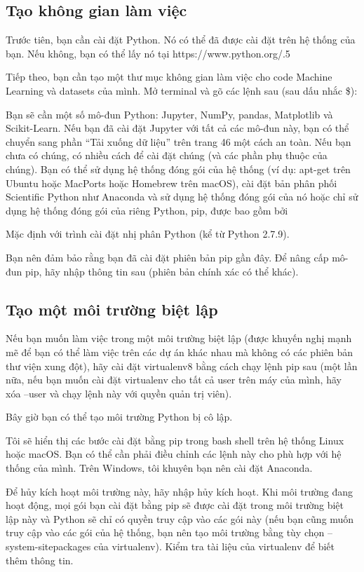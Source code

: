 \subsection{Tạo không gian làm việc}

Trước tiên, bạn cần cài đặt Python. Nó có thể đã được cài đặt trên hệ thống của bạn. Nếu không, bạn có thể lấy nó tại https://www.python.org/.5

Tiếp theo, bạn cần tạo một thư mục không gian làm việc cho code Machine Learning và datasets của mình. Mở terminal và gõ các lệnh sau (sau dấu nhắc \$):

Bạn sẽ cần một số mô-đun Python: Jupyter, NumPy, pandas, Matplotlib và Scikit-Learn. Nếu bạn đã cài đặt Jupyter với tất cả các mô-đun này, bạn có thể chuyển sang phần “Tải xuống dữ liệu” trên trang 46 một cách an toàn. Nếu bạn chưa có chúng, có nhiều cách để cài đặt chúng (và các phần phụ thuộc của chúng). Bạn có thể sử dụng hệ thống đóng gói của hệ thống (ví dụ: apt-get trên Ubuntu hoặc MacPorts hoặc Homebrew trên macOS), cài đặt bản phân phối Scientific Python như Anaconda và sử dụng hệ thống đóng gói của nó hoặc chỉ sử dụng hệ thống đóng gói của riêng Python, pip, được bao gồm bởi

Mặc định với trình cài đặt nhị phân Python (kể từ Python 2.7.9).

Bạn nên đảm bảo rằng bạn đã cài đặt phiên bản pip gần đây. Để nâng cấp mô-đun pip, hãy nhập thông tin sau (phiên bản chính xác có thể khác).

\subsection{Tạo một môi trường biệt lập}

Nếu bạn muốn làm việc trong một môi trường biệt lập (được khuyến nghị mạnh mẽ để bạn có thể làm việc trên các dự án khác nhau mà không có các phiên bản thư viện xung đột), hãy cài đặt virtualenv8 bằng cách chạy lệnh pip sau (một lần nữa, nếu bạn muốn cài đặt virtualenv cho tất cả user trên máy của mình, hãy xóa --user và chạy lệnh này với quyền quản trị viên).

Bây giờ bạn có thể tạo môi trường Python bị cô lập.

Tôi sẽ hiển thị các bước cài đặt bằng pip trong bash shell trên hệ thống Linux hoặc macOS. Bạn có thể cần phải điều chỉnh các lệnh này cho phù hợp với hệ thống của mình. Trên Windows, tôi khuyên bạn nên cài đặt Anaconda.

Để hủy kích hoạt môi trường này, hãy nhập hủy kích hoạt. Khi môi trường đang hoạt động, mọi gói bạn cài đặt bằng pip sẽ được cài đặt trong môi trường biệt lập này và Python sẽ chỉ có quyền truy cập vào các gói này (nếu bạn cũng muốn truy cập vào các gói của hệ thống, bạn nên tạo môi trường bằng tùy chọn --system-sitepackages của virtualenv). Kiểm tra tài liệu của virtualenv để biết thêm thông tin.

